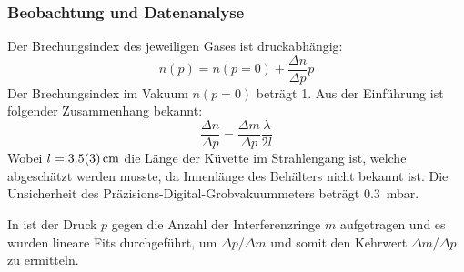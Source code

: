 \documentclass[
	a4paper,
	12pt,
	pagesize,
	ngerman
]{scrartcl}
\begin{document}
	\subsubsection{Beobachtung und Datenanalyse}
	Der Brechungsindex des jeweiligen Gases ist druckabhängig:
	\begin{equation}
		n(p) = n(p=0) + \frac{\Delta n}{\Delta p}p
	\end{equation}
	Der Brechungsindex im Vakuum $n(p=0)$ beträgt 1.
	Aus der Einführung ist folgender Zusammenhang bekannt: %
	\begin{equation}
			\frac{\Delta n}{\Delta p} = \frac{\Delta m}{\Delta p} \frac{\lambda}{2l}
	\end{equation}
	Wobei $l=\SI{3.5+-0.3}{cm}$ die Länge der Küvette im Strahlengang ist, welche abgeschätzt werden musste, da Innenlänge des Behälters nicht bekannt ist.
	Die Unsicherheit des Präzisions-Digital-Grobvakuummeters beträgt \SI{0.3}{mbar}.

	In  ist der Druck $p$ gegen die Anzahl der Interferenzringe $m$ aufgetragen und es wurden lineare Fits durchgeführt, um $\Delta p / \Delta m$ und somit den Kehrwert $\Delta m / \Delta p$ zu ermitteln.
\end{document}
